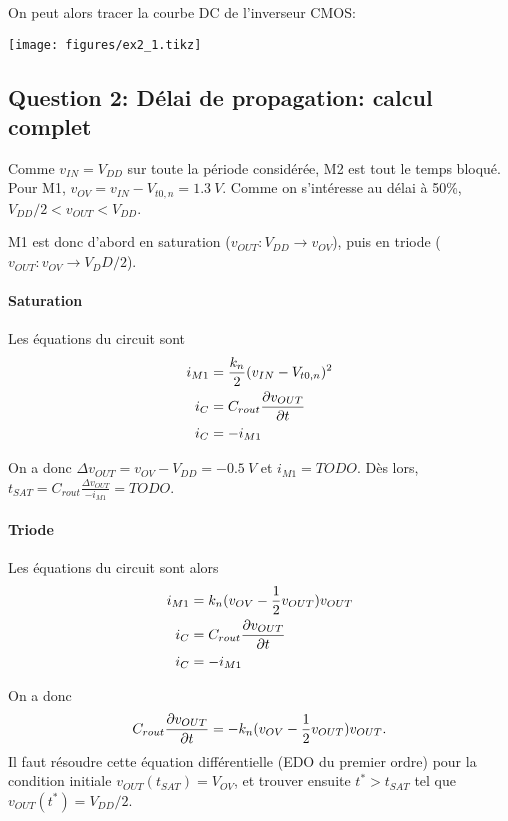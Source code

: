 \documentclass[frenchb,DIV=14]{scrartcl}
\begin{document}
On peut alors tracer la courbe DC de l'inverseur CMOS:
\begin{center}
\texttt{[image: figures/ex2\_1.tikz]}
\end{center}

\subsection*{Question 2: Délai de propagation: calcul complet}

Comme $v_{IN} = V_{DD}$ sur toute la période considérée, M2 est tout le temps
bloqué. Pour M1, $v_{OV} = v_{IN} - V_{t0,n} = \SI{1.3}{V}$.
Comme on s'intéresse au délai à 50\%, $V_{DD}/2 < v_{OUT} < V_{DD}$.

M1 est donc d'abord en saturation
($v_{OUT}: V_{DD} \rightarrow v_{OV}$), puis en triode
($v_{OUT}: v_{OV} \rightarrow V_DD/2$).

\paragraph{Saturation}

Les équations du circuit sont
\begin{align*}
    i_{M1} &= \frac{k_n}{2}(v_{IN} - V_{t0,n})^2 \\
    i_C &= C_{rout}\frac{\partial v_{OUT}}{\partial t} \\
    i_C &= -i_{M1} \\
\end{align*}

On a donc $\Delta v_{OUT} = v_{OV} - V_{DD} = \SI{-0.5}{V}$ et
$i_{M1} = TODO$.
Dès lors, $t_{SAT} = C_{rout}\frac{\Delta v_{OUT}}{-i_{M1}} = TODO$.

\paragraph{Triode}

Les équations du circuit sont alors
\begin{align*}
    i_{M1} &= k_n (v_{OV} - \frac{1}{2}v_{OUT})v_{OUT} \\
    i_C &= C_{rout}\frac{\partial v_{OUT}}{\partial t} \\
    i_C &= -i_{M1} \\
\end{align*}

On a donc
\[C_{rout}\frac{\partial v_{OUT}}{\partial t} = - k_n (v_{OV} - \frac{1}{2}v_{OUT})v_{OUT}.\]
Il faut résoudre cette équation différentielle (EDO du premier ordre) pour
la condition initiale $v_{OUT}(t_{SAT}) = V_{OV}$, et trouver ensuite
$t^* > t_{SAT}$ tel que $v_{OUT}(t^*) = V_{DD}/2$.
\end{document}
